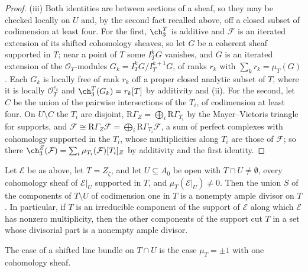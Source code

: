 \begin{proof}
(iii) Both identities are between sections of a sheaf, so they may be checked locally on $U$ and, by the second fact recalled above, off a closed subset of codimension at least four. For the first, $\ch^{T}_{3}$ is additive and $\mathcal{F}$ is an iterated extension of its shifted cohomology sheaves, so let $G$ be a coherent sheaf supported in $T$; near a point of $T$ some $I_{T}^{k}G$ vanishes, and $G$ is an iterated extension of the $\mathcal{O}_{T}$-modules $G_{k}=I_{T}^{k}G/I_{T}^{k+1}G$, of ranks $r_{k}$ with $\sum_{k}r_{k}=\mu_{T}(G)$. Each $G_{k}$ is locally free of rank $r_{k}$ off a proper closed analytic subset of $T$, where it is locally $\mathcal{O}_{T}^{r_{k}}$ and $\ch^{T}_{3}(G_{k})=r_{k}[T]$ by additivity and (ii). For the second, let $C$ be the union of the pairwise intersections of the $T_{i}$, of codimension at least four. On $U\setminus C$ the $T_{i}$ are disjoint, $\mathrm{R}\Gamma_{Z}=\bigoplus_{i}\mathrm{R}\Gamma_{T_{i}}$ by the Mayer--Vietoris triangle for supports, and $\mathcal{F}\cong\mathrm{R}\Gamma_{Z}\mathcal{F}=\bigoplus_{i}\mathrm{R}\Gamma_{T_{i}}\mathcal{F}$, a sum of perfect complexes with cohomology supported in the $T_{i}$, whose multiplicities along $T_{i}$ are those of $\mathcal{F}$; so there $\ch^{Z}_{3}(\mathcal{F})=\sum_{i}\mu_{T_{i}}(\mathcal{F})[T_{i}]_{Z}$ by additivity and the first identity.
\end{proof}

\begin{theorem}[Locality]\label{thm:locality}
Let $\mathcal{E}$ be as above, let $T=Z_{\zeta}$, and let $U\subseteq A_{0}$ be open with $T\cap U\ne\emptyset$, every cohomology sheaf of $\mathcal{E}|_{U}$ supported in $T$, and $\mu_{T}(\mathcal{E}|_{U})\ne0$. Then the union $S$ of the components of $T\setminus U$ of codimension one in $T$ is a nonempty ample divisor on $T$. In particular, if $T$ is an irreducible component of the support of $\mathcal{E}$ along which $\mathcal{E}$ has nonzero multiplicity, then the other components of the support cut $T$ in a set whose divisorial part is a nonempty ample divisor.
\end{theorem}

The case of a shifted line bundle on $T\cap U$ is the case $\mu_{T}=\pm1$ with one cohomology sheaf.

